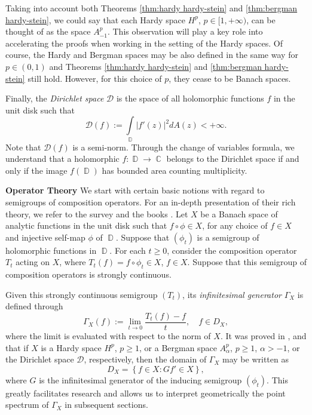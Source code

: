 \documentclass[11pt]{amsart}
\numberwithin{equation}{section}
\newcommand{\hiddennumberedsubsection}[1]{%
	\refstepcounter{subsection}%
	\subsectionmark{#1}%
	\noindent\textbf{\thesubsection\quad #1}%
}
\theoremstyle{definition}
\DeclareMathOperator{\C}{\mathbb{C}}
\DeclareMathOperator{\D}{\mathbb{D}}
\begin{document}
	Taking into account both Theorems \ref{thm:hardy hardy-stein} and \ref{thm:bergman hardy-stein}, we could say that each Hardy space $H^p$, $p\in[1,+\infty)$, can be thought of as the space $A_{-1}^p$. This observation will play a key role into accelerating the proofs when working in the setting of the Hardy spaces. Of course, the Hardy and Bergman spaces may be also defined in the same way for $p\in(0,1)$ and Theorems \ref{thm:hardy hardy-stein} and \ref{thm:bergman hardy-stein} still hold. However, for this choice of $p$, they cease to be Banach spaces.
	
	Finally, the \textit{Dirichlet space} $\mathcal{D}$ is the space of all holomorphic functions $f$ in the unit disk such that
	\begin{equation}
		\mathcal{D}(f):=\int\limits_{\D}|f'(z)|^2dA(z)<+\infty.
	\end{equation}
	Note that $\mathcal{D}(f)$ is a semi-norm. Through the change of variables formula, we understand that a holomorphic $f:\D\to\C$ belongs to the Dirichlet space if and only if the image $f(\D)$ has bounded area counting multiplicity. 
	
	
	\hiddennumberedsubsection{Operator Theory}\label{sub:operator theory}
	We start with certain basic notions with regard to semigroups of composition operators. For an in-depth presentation of their rich theory, we refer to the survey \cite{siskakis_review} and the books \cite{Cowen-Maccluer, zhu}. Let $X$ be a Banach space of analytic functions in the unit disk such that $f\circ \phi\in X$, for any choice of $f\in X$ and injective self-map $\phi$ of $\D$. Suppose that $(\phi_t)$ is a semigroup of holomorphic functions in $\D$. For each $t\ge0$, consider the composition operator $T_t$ acting on $X$, where $T_t(f)=f\circ\phi_t\in X$, $f\in X$. Suppose that this semigroup of composition operators is strongly continuous.
	
	Given this strongly continuous semigroup $(T_t)$, its \textit{infinitesimal generator} $\Gamma_X$ is defined through
	\begin{equation}\label{eq:infinitesimal generator}
		\Gamma_X(f):=\lim\limits_{t\to0}\dfrac{T_t(f)-f}{t}, \quad f\in D_X,
	\end{equation}
	where the limit is evaluated with respect to the norm of $X$. It was proved in \cite[Theorem 3.7]{berksonporta}, \cite[Theorem 1]{Siskakis-Bergman} and \cite[Theorem 1]{Siskakis-Dirichlet} that if $X$ is a Hardy space $H^p$, $p\ge1$, or a Bergman space $A_\alpha^p$, $p\ge1$, $\alpha>-1$, or the Dirichlet space $\mathcal{D}$, respectively, then the domain of $\Gamma_X$ may be written as
	\begin{equation}\label{eq:domain of generator}
		D_X=\left\{f\in X:Gf'\in X\right\},
	\end{equation}
	where $G$ is the infinitesimal generator of the inducing semigroup $(\phi_t)$. This greatly facilitates research and allows us to interpret geometrically the point spectrum of $\Gamma_X$ in subsequent sections.
	
\end{document}
